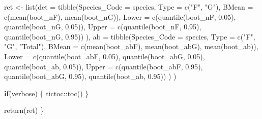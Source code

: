 \documentclass[
]{article}
\newenvironment{Shaded}{\begin{snugshade}}{\end{snugshade}}
\newcommand{\AttributeTok}[1]{\textcolor[rgb]{0.77,0.63,0.00}{#1}}
\newcommand{\ControlFlowTok}[1]{\textcolor[rgb]{0.13,0.29,0.53}{\textbf{#1}}}
\newcommand{\FloatTok}[1]{\textcolor[rgb]{0.00,0.00,0.81}{#1}}
\newcommand{\FunctionTok}[1]{\textcolor[rgb]{0.00,0.00,0.00}{#1}}
\newcommand{\NormalTok}[1]{#1}
\newcommand{\OtherTok}[1]{\textcolor[rgb]{0.56,0.35,0.01}{#1}}
\newcommand{\SpecialCharTok}[1]{\textcolor[rgb]{0.00,0.00,0.00}{#1}}
\newcommand{\StringTok}[1]{\textcolor[rgb]{0.31,0.60,0.02}{#1}}
\begin{document}
\begin{Shaded}
\begin{Highlighting}[]
\NormalTok{  ret }\OtherTok{\textless{}{-}} \FunctionTok{list}\NormalTok{(}\AttributeTok{det =} \FunctionTok{tibble}\NormalTok{(}\AttributeTok{Species\_Code =}\NormalTok{ species,}
                     \AttributeTok{Type =} \FunctionTok{c}\NormalTok{(}\StringTok{"F"}\NormalTok{, }\StringTok{"G"}\NormalTok{),}
                     \AttributeTok{BMean =} \FunctionTok{c}\NormalTok{(}\FunctionTok{mean}\NormalTok{(boot\_nF), }\FunctionTok{mean}\NormalTok{(boot\_nG)),}
                     \AttributeTok{Lower =} \FunctionTok{c}\NormalTok{(}\FunctionTok{quantile}\NormalTok{(boot\_nF, }\FloatTok{0.05}\NormalTok{), }\FunctionTok{quantile}\NormalTok{(boot\_nG, }\FloatTok{0.05}\NormalTok{)),}
                     \AttributeTok{Upper =} \FunctionTok{c}\NormalTok{(}\FunctionTok{quantile}\NormalTok{(boot\_nF, }\FloatTok{0.95}\NormalTok{), }\FunctionTok{quantile}\NormalTok{(boot\_nG, }\FloatTok{0.95}\NormalTok{))}
\NormalTok{                    ),}
              \AttributeTok{ab =} \FunctionTok{tibble}\NormalTok{(}\AttributeTok{Species\_Code =}\NormalTok{ species,}
                    \AttributeTok{Type =} \FunctionTok{c}\NormalTok{(}\StringTok{"F"}\NormalTok{, }\StringTok{"G"}\NormalTok{, }\StringTok{"Total"}\NormalTok{),}
                    \AttributeTok{BMean =} \FunctionTok{c}\NormalTok{(}\FunctionTok{mean}\NormalTok{(boot\_abF), }\FunctionTok{mean}\NormalTok{(boot\_abG), }\FunctionTok{mean}\NormalTok{(boot\_ab)),}
                    \AttributeTok{Lower =} \FunctionTok{c}\NormalTok{(}\FunctionTok{quantile}\NormalTok{(boot\_abF, }\FloatTok{0.05}\NormalTok{), }\FunctionTok{quantile}\NormalTok{(boot\_abG, }\FloatTok{0.05}\NormalTok{), }\FunctionTok{quantile}\NormalTok{(boot\_ab, }\FloatTok{0.05}\NormalTok{)),}
                    \AttributeTok{Upper =} \FunctionTok{c}\NormalTok{(}\FunctionTok{quantile}\NormalTok{(boot\_abF, }\FloatTok{0.95}\NormalTok{), }\FunctionTok{quantile}\NormalTok{(boot\_abG, }\FloatTok{0.95}\NormalTok{), }\FunctionTok{quantile}\NormalTok{(boot\_ab, }\FloatTok{0.95}\NormalTok{))}
\NormalTok{                    )}
\NormalTok{              )}
    
  \ControlFlowTok{if}\NormalTok{(verbose) \{}
\NormalTok{    tictoc}\SpecialCharTok{::}\FunctionTok{toc}\NormalTok{()}
\NormalTok{  \}}
 
  \FunctionTok{return}\NormalTok{(ret)}
\NormalTok{\}}
\end{Highlighting}
\end{Shaded}
\end{document}
